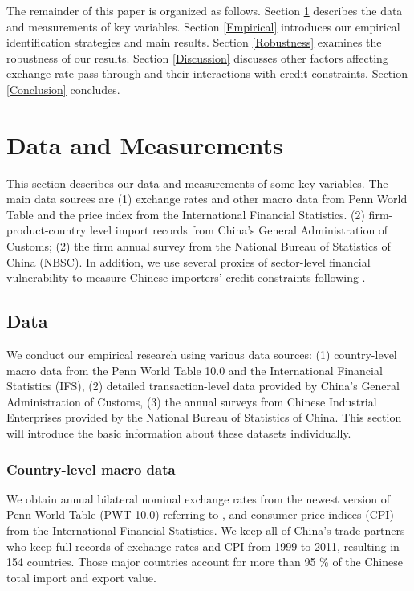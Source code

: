 \documentclass[12pt]{article}
\begin{document}
The remainder of this paper is organized as follows. Section \ref{Data&Measurements} describes the data and measurements of key variables. Section \ref{Empirical} introduces our empirical identification strategies and main results. Section \ref{Robustness} examines the robustness of our results.  Section \ref{Discussion} discusses other factors affecting exchange rate pass-through and their interactions with credit constraints. Section \ref{Conclusion} concludes.

\section{Data and Measurements} \label{Data&Measurements}

This section describes our data and measurements of some key variables. The main data sources are (1) exchange rates and other macro data from Penn World Table and the price index from the International Financial Statistics. (2) firm-product-country level import records from China’s General Administration of Customs; (2) the firm annual survey from the National Bureau of Statistics of China (NBSC). In addition, we use several proxies of sector-level financial vulnerability to measure Chinese importers' credit constraints following \cite{manova2013}.

\subsection{Data} \label{Data}

We conduct our empirical research using various data sources: (1) country-level macro data from the Penn World Table 10.0 and the International Financial Statistics (IFS), (2) detailed transaction-level data provided by China’s General Administration of Customs, (3) the annual surveys from Chinese Industrial Enterprises provided by the National Bureau of Statistics of China.  This section will introduce the basic information about these datasets individually.

\subsubsection{Country-level macro data} \label{Data-Macro}

We obtain annual bilateral nominal exchange rates from the newest version of Penn World Table (PWT 10.0) referring to \cite{feenstra2015}, and consumer price indices (CPI) from the International Financial Statistics. We keep all of China's trade partners who keep full records of exchange rates and CPI from 1999 to 2011, resulting in 154 countries. Those major countries account for more than 95 \% of the Chinese total import and export value.
\end{document}
